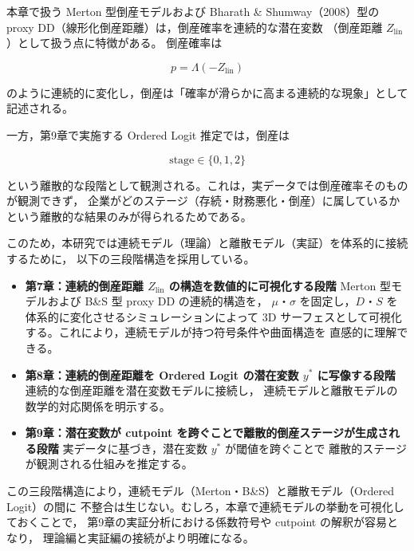 本章で扱う Merton 型倒産モデルおよび Bharath \& Shumway（2008）型の
proxy DD（線形化倒産距離）は，倒産確率を連続的な潜在変数
（倒産距離 $Z_{\text{lin}}$）として扱う点に特徴がある。
倒産確率は



\[
    p = \Lambda(-Z_{\text{lin}})
\]



のように連続的に変化し，倒産は「確率が滑らかに高まる連続的な現象」として記述される。

一方，第9章で実施する Ordered Logit 推定では，倒産は



\[
    \text{stage} \in \{0,1,2\}
\]



という離散的な段階として観測される。これは，実データでは倒産確率そのものが観測できず，
企業がどのステージ（存続・財務悪化・倒産）に属しているかという離散的な結果のみが得られるためである。

このため，本研究では連続モデル（理論）と離散モデル（実証）を体系的に接続するために，
以下の三段階構造を採用している。

\begin{itemize}
    \item \textbf{第7章：連続的倒産距離 $Z_{\text{lin}}$ の構造を数値的に可視化する段階}  
    Merton 型モデルおよび B\&S 型 proxy DD の連続的構造を，
    $\mu$・$\sigma$ を固定し，$D$・$S$ を体系的に変化させるシミュレーションによって
    3D サーフェスとして可視化する。これにより，連続モデルが持つ符号条件や曲面構造を
    直感的に理解できる。

    \item \textbf{第8章：連続的倒産距離を Ordered Logit の潜在変数 $y^*$ に写像する段階}  
    連続的な倒産距離を潜在変数モデルに接続し，
    連続モデルと離散モデルの数学的対応関係を明示する。

    \item \textbf{第9章：潜在変数が cutpoint を跨ぐことで離散的倒産ステージが生成される段階}  
    実データに基づき，潜在変数 $y^*$ が閾値を跨ぐことで
    離散的ステージが観測される仕組みを推定する。
\end{itemize}

この三段階構造により，連続モデル（Merton・B\&S）と離散モデル（Ordered Logit）の間に
不整合は生じない。むしろ，本章で連続モデルの挙動を可視化しておくことで，
第9章の実証分析における係数符号や cutpoint の解釈が容易となり，
理論編と実証編の接続がより明確になる。

